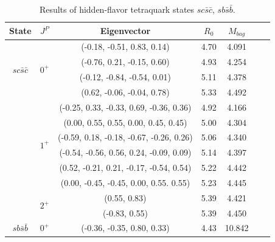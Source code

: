 \documentclass[prd,twocolumn,floatfix,nofootinbib]{revtex4}
\begin{document}
\renewcommand{\tabcolsep}{0.84cm}
\renewcommand{\arraystretch}{1.2}
\begin{table}[!htbp]
    \caption{Results of hidden-flavor tetraquark states $sc\bar{s}\bar{c}$, $sb\bar{s}\bar{b}$.}
    \label{tab:hiddenflavor-sQsQ}
    \begin{tabular}{ccccccc}
        \hline\hline
        {\rm State}     &$J^{P}$    &{\rm Eigenvector}                          &$R_{0}$    &$M_{bag}$ \\ \hline
        \multirow{4}{*}{$sc\bar{s}\bar{c}$}
                        &\multirow{4}{*}{$0^{+}$}
                                    &(-0.18, -0.51, 0.83, 0.14)                 &4.70	    &4.091 \\ 
                        &           &(-0.76, 0.21, -0.15, 0.60)                 &4.93	    &4.254 \\ 
                        &           &(-0.12, -0.84, -0.54, 0.01)                &5.11	    &4.378 \\ 
                        &           &(0.62, -0.06, -0.04, 0.78)                 &5.33	    &4.492 \\                    
                        &\multirow{6}{*}{$1^{+}$}
                                    &(-0.25, 0.33, -0.33, 0.69, -0.36, 0.36)    &4.92	    &4.166 \\ 
                        &           &(0.00, 0.55, 0.55, 0.00, 0.45, 0.45)       &5.00	    &4.304 \\ 
                        &           &(-0.59, 0.18, -0.18, -0.67, -0.26, 0.26)   &5.06	    &4.340 \\ 
                        &           &(-0.54, -0.56, 0.56, 0.24, -0.09, 0.09)    &5.14	    &4.397 \\ 
                        &           &(0.52, -0.21, 0.21, -0.17, -0.54, 0.54)    &5.22	    &4.442 \\ 
                        &           &(0.00, -0.45, -0.45, 0.00, 0.55. 0.55)     &5.23	    &4.445 \\ 
                        &\multirow{2}{*}{$2^{+}$}
                                    &(0.55, 0.83)                               &5.39	    &4.421 \\ 
                        &           &(-0.83, 0.55)                              &5.39	    &4.450 \\ 
        \multirow{4}{*}{$sb\bar{s}\bar{b}$}
                        &\multirow{4}{*}{$0^{+}$}
                                    &(-0.36, -0.35, 0.80, 0.33)                 &4.43	    &10.842 \\ 

\end{tabular}
\end{table}
\end{document}
